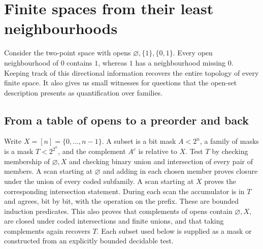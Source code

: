 \section{Finite spaces from their least neighbourhoods}
\label{sec:finite-spaces}

Consider the two-point space with opens $\varnothing,\{1\},\{0,1\}$.
Every open neighbourhood of $0$ contains $1$, whereas $1$ has a
neighbourhood missing $0$. Keeping track of this directional information
recovers the entire topology of every finite space. It also gives us small
witnesses for questions that the open-set description presents as
quantification over families.

\subsection{From a table of opens to a preorder and back}

Write $X=[n]=\{0,\ldots,n-1\}$. A subset is a bit mask $A<2^n$, a
family of masks is a mask $T<2^{2^n}$, and the complement $A^c$ is relative
to $X$. Test $T$ by checking membership of $\varnothing,X$ and checking
binary union and intersection of every pair of members. A scan starting at
$\varnothing$ and adding in each chosen member proves closure under the
union of every coded subfamily. A scan starting at $X$ proves the
corresponding intersection statement. During each scan the accumulator is
in $T$ and agrees, bit by bit, with the operation on the prefix. These are
bounded induction predicates. This also proves that complements of opens
contain $\varnothing,X$, are closed under coded intersections and finite
unions, and that taking complements again recovers $T$. Each subset used below is supplied as a mask or constructed from an
explicitly bounded decidable test.

